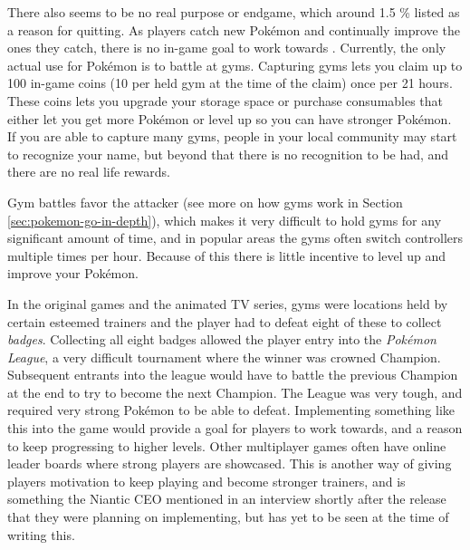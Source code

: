 There also seems to be no real purpose or endgame, which around 1.5 \% listed as a reason for quitting. As players catch new Pokémon and continually improve the ones they catch, there is no in-game goal to work towards . Currently, the only actual use for Pokémon is to battle at gyms. Capturing gyms lets you claim up to 100 in-game coins (10 per held gym at the time of the claim) once per 21 hours. These coins lets you upgrade your storage space or purchase consumables that either let you get more Pokémon or level up so you can have stronger Pokémon. If you are able to capture many gyms, people in your local community may start to recognize your name, but beyond that there is no recognition to be had, and there are no real life rewards.

Gym battles favor the attacker (see more on how gyms work in Section \ref{sec:pokemon-go-in-depth}), which makes it very difficult to hold gyms for any significant amount of time, and in popular areas the gyms often switch controllers multiple times per hour. Because of this there is little incentive to level up and improve your Pokémon.

In the original games and the animated TV series, gyms were locations held by certain esteemed trainers and the player had to defeat eight of these to collect \emph{badges}. Collecting all eight badges allowed the player entry into the \emph{Pokémon League}, a very difficult tournament where the winner was crowned Champion. Subsequent entrants into the league would have to battle the previous Champion at the end to try to become the next Champion. The League was very tough, and required very strong Pokémon to be able to defeat. Implementing something like this into the game would provide a goal for players to work towards, and a reason to keep progressing to higher levels. Other multiplayer games often have online leader boards where strong players are showcased. This is another way of giving players motivation to keep playing and become stronger trainers, and is something the Niantic CEO mentioned in an interview shortly after the release  that they were planning on implementing, but has yet to be seen at the time of writing this.

